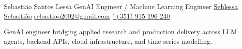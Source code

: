 \documentclass{seb-cv}
\begin{document}
\namesection
{Sebastião}
{Santos Lessa}
{GenAI Engineer / Machine Learning Engineer}
{
  \contactline
    {\href{https://github.com/seblessa}{Seblessa}}
    {\href{https://www.linkedin.com/in/sebastiao-santos-lessa}{Sebastião}}
    {\href{mailto:sebastiao2002@gmail.com}{sebastiao2002@gmail.com}}
    {\href{tel:+351915196240}{(+351) 915 196 240}}
}

\headerbar

\vspace{3pt}
\begin{center}
\fontsize{9.5pt}{12pt}\selectfont
GenAI engineer bridging applied research and production delivery across LLM agents, backend APIs, cloud infrastructure, and time series modelling.
\end{center}
\vspace{-2pt}
\end{document}

